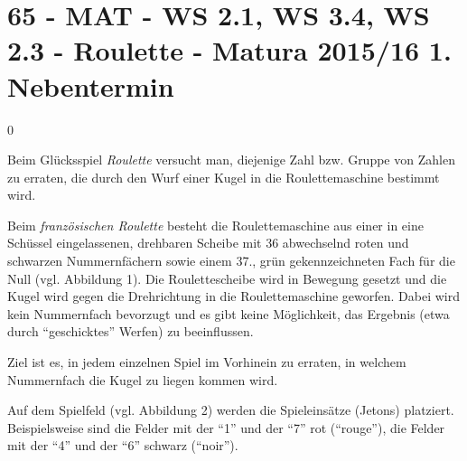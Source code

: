 \section{65 - MAT - WS 2.1, WS 3.4, WS 2.3 - Roulette - Matura 2015/16 1. Nebentermin}

\begin{langesbeispiel} \item[0] %
	
Beim Glücksspiel \textit{Roulette} versucht man, diejenige Zahl bzw. Gruppe von Zahlen zu erraten, die durch den Wurf einer Kugel in die Roulettemaschine bestimmt wird. 

Beim \textit{französischen Roulette} besteht die Roulettemaschine aus einer in eine Schüssel eingelassenen, drehbaren Scheibe mit 36 abwechselnd roten und schwarzen Nummernfächern sowie einem 37., grün gekennzeichneten Fach für die Null (vgl. Abbildung 1). Die Roulettescheibe wird in Bewegung gesetzt und die Kugel wird gegen die Drehrichtung in die Roulettemaschine geworfen. Dabei wird kein Nummernfach bevorzugt und es gibt keine Möglichkeit, das Ergebnis (etwa durch "`geschicktes"' Werfen) zu beeinflussen. 

Ziel ist es, in jedem einzelnen Spiel im Vorhinein zu erraten, in welchem Nummernfach die Kugel zu liegen kommen wird. 

Auf dem Spielfeld (vgl. Abbildung 2) werden die Spieleinsätze (Jetons) platziert. Beispielsweise sind die Felder mit der "`1"' und der "`7"' rot ("`rouge"'), die Felder mit der "`4"' und der "`6"' schwarz ("`noir"').

\end{langesbeispiel}

